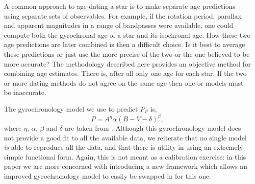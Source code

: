 A common approach to age-dating a star is to make separate age predictions
using separate sets of observables.
For example, if the rotation period, parallax and apparent magnitudes in a
range of bandpasses were available, one could compute both the gyrochronal age
of a star and its isochronal age.
How these two age predictions are later combined is then a difficult choice.
Is it best to average these predictions or just use the more precise of the
two or the one believed to be more accurate?
The methodology described here provides an objective method for combining age
estimates.
There is, after all only one age for each star.
If the two or more dating methods do not agree on the same age then one or
models must be inaccurate.

The gyrochronology model we use to predict $P_P$ is, %
\begin{equation}
    P = A^\eta \alpha (B-V - \delta)^\beta,
\end{equation}
\label{eqn:gyro}
where $\eta$, $\alpha$, $\beta$ and $\delta$ are taken from \citet{angus2015}.
Although this gyrochronology model does not provide a good fit to all the
available data, we reiterate that no single model {\it is} able to reproduce
all the data, and that there is utility in using an extremely simple
functional form.
Again, this is not meant as a calibration exercise: in this paper we are more
concerned with introducing a new framework which allows an improved
gyrochronology model to easily be swapped in for this one.

